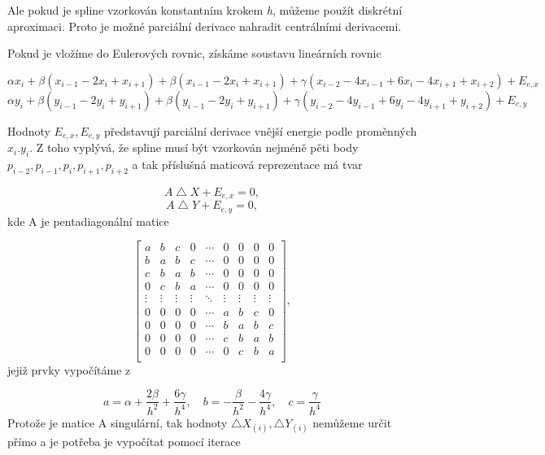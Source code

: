 \documentclass[oneside,12pt,a4paper]{book}
\begin{document}
Ale pokud je spline vzorkován konstantním krokem \emph{h}, můžeme použít diskrétní aproximaci. Proto je možné parciální derivace nahradit centrálními derivacemi.

Pokud je vložíme do Eulerových rovnic, získáme soustavu lineárních rovnic

\begin{equation}
\alpha x_i+\beta(x_{i-1}-2x_i + x_{i+1})+ \beta(x_{i-1}-2x_i + x_{i+1})+\gamma(x_{i-2}-4x_{i-1} + 
6x_i-4x_{i+1}+x_{i+2})+E_{e,x}
\end{equation}
\begin{equation}
\alpha y_i+\beta(y_{i-1}-2y_i + y_{i+1})+ \beta(y_{i-1}-2y_i + y_{i+1})+\gamma(y_{i-2}-4y_{i-1} + 
6y_i-4y_{i+1}+y_{i+2})+E_{e,y}
\end{equation}

Hodnoty $E_{e,x},E_{e,y}$ představují parciální derivace vnější energie podle proměnných $ x_i.y_i$. Z toho vyplývá, že spline musí být vzorkován nejméně pěti body $ p_{i-2},p_{i-1},p_i,p_{i+1},p_{i+2}$ 
a tak příslušná maticová reprezentace má tvar 

\begin{equation}
A\bigtriangleup X + E_{e,x} = 0,
\end{equation}
\begin{equation}
A\bigtriangleup Y + E_{e,y} = 0,
\end{equation}
kde A je pentadiagonální matice

\begin{equation}
\begin{bmatrix} 
a & b & c & 0& \cdots & 0 & 0 & 0 & 0  \\
b & a & b & c& \cdots & 0 & 0 & 0 & 0  \\
c & b & a & b &\cdots & 0 & 0 & 0 & 0  \\
0 & c & b & a& \cdots & 0 & 0 & 0 & 0  \\
\vdots & \vdots &\vdots &\vdots & \ddots & \vdots &\vdots &\vdots &\vdots \\ 
0 & 0 & 0 & 0 &  \cdots & a & b & c & 0 \\
0 & 0 & 0 & 0 &  \cdots &b & a & b & c \\
0 & 0 & 0 & 0 &  \cdots &c & b & a & b \\
0 & 0 & 0 & 0 & \cdots &0 & c & b & a \\
\end{bmatrix},
\end{equation}
jejiž prvky vypočítáme z 

\begin{equation}
a = \alpha + \frac{2\beta}{h^2}+\frac{6\gamma}{h^4}, \quad b = -\frac{\beta}{h^2}-\frac{4\gamma}{h^4}, \quad 
c = \frac{\gamma}{h^4}
\end{equation}
Protože je matice A singulární, tak hodnoty  $\bigtriangleup X_{(i)},\bigtriangleup Y_{(i)}$ nemůžeme určit přímo a je potřeba je vypočítat pomocí iterace
\end{document}
